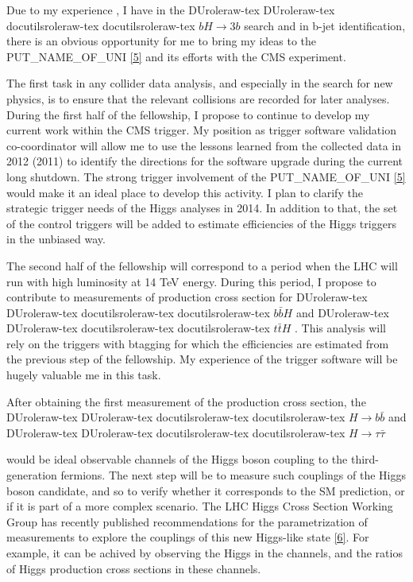 \documentclass[a4paper]{article}
\providecommand*{\DUrole}[2]{%
  \ifcsname DUrole#1\endcsname%
    \csname DUrole#1\endcsname{#2}%
  \else%
    \ifcsname docutilsrole#1\endcsname%
      \csname docutilsrole#1\endcsname{#2}%
    \else%
      #2%
    \fi%
  \fi%
}
\begin{document}
Due to my experience , I have in the \DUrole{raw-tex}{$bH\rightarrow 3b$}  search
and in b-jet identification, there is an obvious opportunity for me
to bring my ideas to the PUT\_NAME\_OF\_UNI \hyperlink{ref5}{[5]} and its efforts with the CMS
experiment.

The first task in any collider data analysis, and especially in the search for new physics, is to ensure
that the relevant collisions are recorded for later analyses. During the first
half of the fellowship, I propose to continue to develop my current work within the
CMS  trigger. My position as trigger software validation co-coordinator will allow me to use the lessons
learned from the  collected data  in 2012 (2011) to identify
the directions for the software upgrade during the current long shutdown.
The strong trigger involvement of the  PUT\_NAME\_OF\_UNI \hyperlink{ref5}{[5]}
would make it an ideal place to develop
this activity.  I plan to clarify  the strategic trigger needs of the Higgs analyses  in 2014.
In addition to that, the set of the control triggers will be added to estimate efficiencies of the
Higgs triggers   in the unbiased way.

The second half of the fellowship will correspond to a period when the LHC will run with high
luminosity at 14 TeV energy. During this period,
I propose  to contribute   to measurements of production cross section   for \DUrole{raw-tex}{$b\bar{b}H$} and \DUrole{raw-tex}{$t\bar{t}H$}.
This analysis will rely on  the triggers with btagging for which  the efficiencies are estimated from
the previous step of the fellowship. My experience of the trigger software will be hugely valuable me in this task.

After obtaining the first measurement of the production cross section,
the \DUrole{raw-tex}{$H\rightarrow b\bar{b}$} and \DUrole{raw-tex}{$H\rightarrow \tau\bar{\tau}$}
would be ideal  observable channels of the Higgs
boson coupling to the third-generation fermions.  The next step will be to measure
such couplings of the Higgs boson candidate,
and so to verify whether it corresponds to the SM prediction, or if it is part of a more complex scenario.
The LHC Higgs Cross Section Working Group has
recently published recommendations for the parametrization of measurements to explore the
couplings of this new Higgs-like state  \hyperlink{ref6}{[6]}. For example,
it can be achived by observing the Higgs in the channels, and
the ratios of Higgs production cross sections in these channels.
\end{document}
